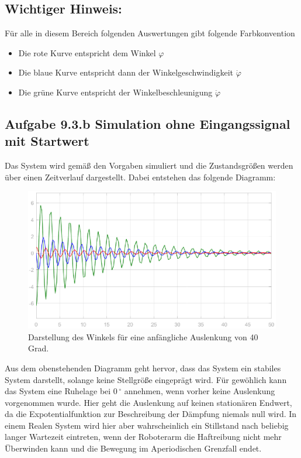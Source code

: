 \documentclass[10pt]{scrartcl}
\begin{document}
\subsection{Wichtiger Hinweis:}
Für alle in diesem Bereich folgenden Auswertungen gibt folgende Farbkonvention
\begin{itemize}
\item Die rote Kurve entspricht dem Winkel $\varphi$
\item Die blaue Kurve entspricht dann der Winkelgeschwindigkeit $\dot \varphi$
\item Die grüne Kurve entspricht der Winkelbeschleunigung  $ \ddot \varphi$
\end{itemize}



\subsection{Aufgabe 9.3.b Simulation ohne Eingangssignal mit Startwert}
Das System wird gemäß den Vorgaben simuliert und die Zustandsgrößen werden über einen Zeitverlauf dargestellt. Dabei entstehen das folgende Diagramm:

\begin{figure}[H]
	\centering
	\includegraphics[width=1\textwidth]{9b}
	\caption{Darstellung des Winkels für eine anfängliche Auslenkung von 40 Grad. }
	\label{img:grafik-dummy}
\end{figure}

Aus dem obenstehenden Diagramm geht hervor, dass das System ein stabiles System darstellt, solange keine Stellgröße eingeprägt wird. Für gewöhlich kann das System eine Ruhelage bei 0\,$^\circ$ annehmen, wenn vorher keine Auslenkung vorgenommen wurde. Hier geht die Auslenkung auf keinen stationären Endwert, da die Expotentialfunktion zur Beschreibung der Dämpfung niemals null wird. In einem Realen System wird hier aber wahrscheinlich ein Stillstand nach beliebig langer Wartezeit eintreten, wenn der Roboterarm die Haftreibung nicht mehr Überwinden kann und die Bewegung im Aperiodischen Grenzfall endet.
\newpage
\end{document}
